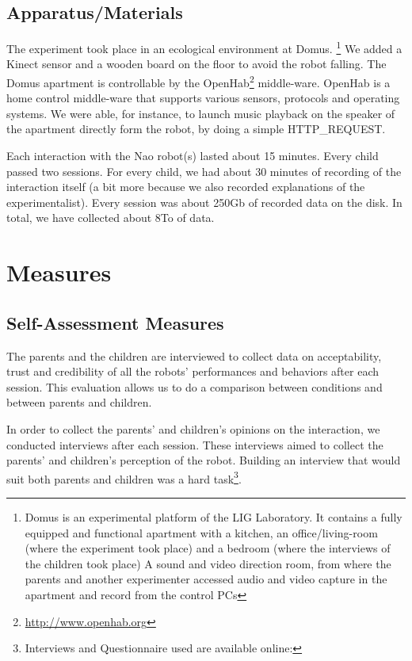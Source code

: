 \documentclass[a4paper,twocolumn]{svjour3}
\begin{document}
\subsection{Apparatus/Materials}
The experiment took place in an ecological environment at Domus.
\footnote{Domus is an experimental platform of the LIG Laboratory.
	It contains a fully equipped and functional apartment with a kitchen, an office/living-room (where the experiment took place) and  a bedroom (where the interviews of the children took place)
	A sound and video direction room, from where the parents and another experimenter accessed audio and video capture in the apartment and record from the control PCs}
We added a Kinect sensor and a wooden board on the floor to avoid the robot falling. 
The Domus apartment is controllable by the OpenHab\footnote{\url{http://www.openhab.org}} middle-ware. 
OpenHab is a home control middle-ware that supports various sensors, protocols and operating systems. 
We were able, for instance, to launch music playback on the speaker of the apartment directly form the robot, by doing a simple HTTP\_REQUEST. 

Each interaction with the Nao robot(s) lasted about 15 minutes. 
Every child passed two sessions. 
For every child, we had about 30 minutes of recording of the interaction itself (a bit more because we also recorded explanations of the experimentalist). 
Every session was about 250Gb of recorded data on the disk. 
In total, we have collected about 8To of data. 


\section{Measures}
\subsection{Self-Assessment Measures}
The parents and the children are interviewed to collect data on acceptability, trust and  credibility of all the robots' performances and behaviors after each session. 
This evaluation allows us to do a comparison between conditions and between parents and children.

In order to collect the parents' and children's opinions on the interaction, we conducted interviews after each session.
These interviews aimed to collect the parents' and children's perception of the robot.
Building an interview that would suit both parents and children was a hard task\footnote{Interviews and Questionnaire used are available online: }.%
\end{document}
